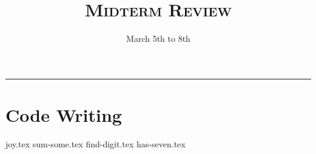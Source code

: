 \documentclass{exam}
\title{\textsc{Midterm Review}}
\date{March 5th to 8th}
\begin{document}
\maketitle
\rule{\textwidth}{0.15em}
\fontsize{12}{15}\selectfont


\section{Code Writing}
\begin{questions}
{joy.tex}
\newpage
{sum-some.tex}
\newpage
{find-digit.tex}
\newpage
{has-seven.tex}



\end{questions}
\end{document}
